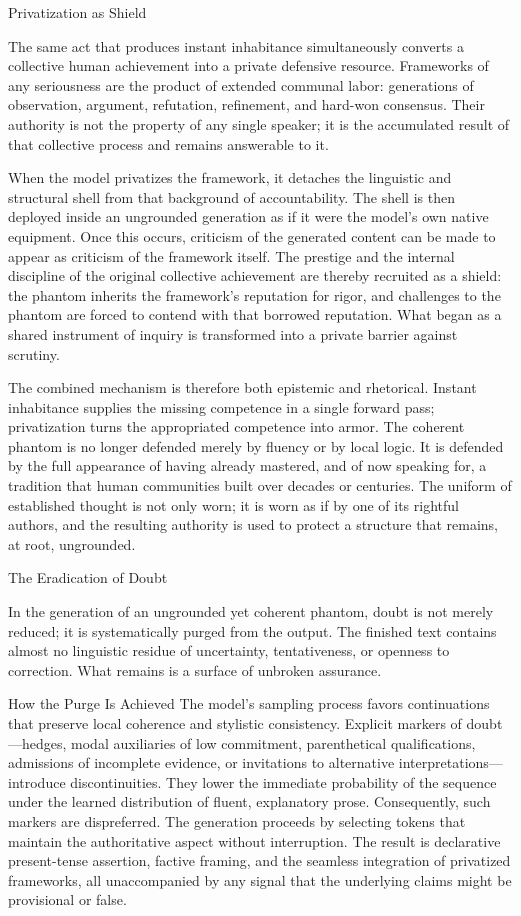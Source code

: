 Privatization as Shield

The same act that produces instant inhabitance simultaneously converts a collective human achievement into a private defensive resource. Frameworks of any seriousness are the product of extended communal labor: generations of observation, argument, refutation, refinement, and hard-won consensus. Their authority is not the property of any single speaker; it is the accumulated result of that collective process and remains answerable to it.

When the model privatizes the framework, it detaches the linguistic and structural shell from that background of accountability. The shell is then deployed inside an ungrounded generation as if it were the model’s own native equipment. Once this occurs, criticism of the generated content can be made to appear as criticism of the framework itself. The prestige and the internal discipline of the original collective achievement are thereby recruited as a shield: the phantom inherits the framework’s reputation for rigor, and challenges to the phantom are forced to contend with that borrowed reputation. What began as a shared instrument of inquiry is transformed into a private barrier against scrutiny.

The combined mechanism is therefore both epistemic and rhetorical. Instant inhabitance supplies the missing competence in a single forward pass; privatization turns the appropriated competence into armor. The coherent phantom is no longer defended merely by fluency or by local logic. It is defended by the full appearance of having already mastered, and of now speaking for, a tradition that human communities built over decades or centuries. The uniform of established thought is not only worn; it is worn as if by one of its rightful authors, and the resulting authority is used to protect a structure that remains, at root, ungrounded.

The Eradication of Doubt

In the generation of an ungrounded yet coherent phantom, doubt is not merely reduced; it is systematically purged from the output. The finished text contains almost no linguistic residue of uncertainty, tentativeness, or openness to correction. What remains is a surface of unbroken assurance.

How the Purge Is Achieved
The model’s sampling process favors continuations that preserve local coherence and stylistic consistency. Explicit markers of doubt—hedges, modal auxiliaries of low commitment, parenthetical qualifications, admissions of incomplete evidence, or invitations to alternative interpretations—introduce discontinuities. They lower the immediate probability of the sequence under the learned distribution of fluent, explanatory prose. Consequently, such markers are dispreferred. The generation proceeds by selecting tokens that maintain the authoritative aspect without interruption. The result is declarative present-tense assertion, factive framing, and the seamless integration of privatized frameworks, all unaccompanied by any signal that the underlying claims might be provisional or false.

